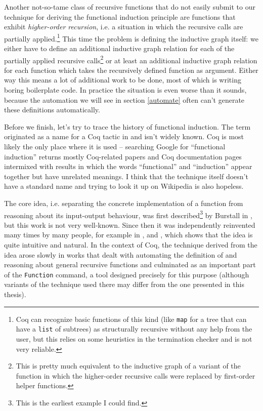 \documentclass[declaration,mgr,english,shortabstract]{iithesis}
\newcommand{\m}[1]{\texttt{#1}}
\begin{document}
Another not-so-tame class of recursive functions that do not easily submit to our technique for deriving the functional induction principle are functions that exhibit \textit{higher-order recursion}, i.e. a situation in which the recursive calls are partially applied.\footnote{Coq can recognize basic functions of this kind (like \m{map} for a tree that can have a \m{list} of subtrees) as structurally recursive without any help from the user, but this relies on some heuristics in the termination checker and is not very reliable.} This time the problem is defining the inductive graph itself: we either have to define an additional inductive graph relation for each of the partially applied recursive calls\footnote{This is pretty much equivalent to the inductive graph of a variant of the function in which the higher-order recursive calls were replaced by first-order helper functions.} or at least an additional inductive graph relation for each function which takes the recursively defined function as argument. Either way this means a lot of additional work to be done, most of which is writing boring boilerplate code. In practice the situation is even worse than it sounds, because the automation we will see in section \ref{automate} often can't generate these definitions automatically.

Before we finish, let's try to trace the history of functional induction. The term originated as a name for a Coq tactic in \cite{FunInd} and isn't widely known. Coq is most likely the only place where it is used -- searching Google for ``functional induction'' returns mostly Coq-related papers and Coq documentation pages intermixed with results in which the words ``functional'' and ``induction'' appear together but have unrelated meanings. I think that the technique itself doesn't have a standard name and trying to look it up on Wikipedia is also hopeless.

The core idea, i.e. separating the concrete implementation of a function from reasoning about its input-output behaviour, was first described\footnote{This is the earliest example I could find.} by Burstall in \cite{Burstall}, but this work is not very well-known. Since then it was independently reinvented many times by many people, for example in \cite{Slind}, \cite{FromTheLeft} and \cite{Program}, which shows that the idea is quite intuitive and natural. In the context of Coq, the technique derived from the idea arose slowly in works that dealt with automating the definition of and reasoning about general recursive functions and culminated as an important part of the \m{Function} \cite{Function} command, a tool designed precisely for this purpose (although variants of the technique used there may differ from the one presented in this thesis).
\end{document}
